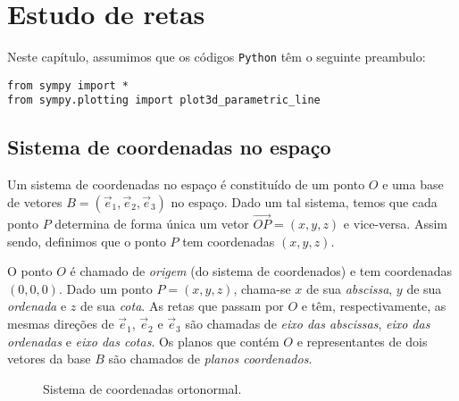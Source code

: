 
\chapter{Estudo de retas}\label{cap_er}
\thispagestyle{fancy}

\ifispython
\begin{obs}\label{obs:cap_er_py}
  Neste capítulo, assumimos que os códigos \verb+Python+ têm o seguinte preambulo:
\begin{verbatim}
from sympy import *
from sympy.plotting import plot3d_parametric_line
\end{verbatim}
\end{obs}
\fi

\section{Sistema de coordenadas no espaço}\label{cap_er_sec_siscoord}

Um sistema de coordenadas no espaço é constituído de um ponto $O$ e uma base de vetores $B = (\vec{e}_1, \vec{e}_2, \vec{e}_3)$ no espaço. Dado um tal sistema, temos que cada ponto $P$ determina de forma única um vetor $\overrightarrow{OP} = (x,y,z)$ e vice-versa. Assim sendo, definimos que o ponto $P$ tem coordenadas $(x,y,z)$.

O ponto $O$ é chamado de \emph{origem} (do sistema de coordenados) e tem coordenadas $(0,0,0)$. Dado um ponto $P=(x,y,z)$, chama-se $x$ de sua \emph{abscissa}, $y$ de sua \emph{ordenada} e $z$ de sua \emph{cota}. As retas que passam por $O$ e têm, respectivamente, as mesmas direções de $\vec{e}_1$, $\vec{e}_2$ e $\vec{e}_3$ são chamadas de \emph{eixo das abscissas}, \emph{eixo das ordenadas} e \emph{eixo das cotas}. Os planos que contém $O$ e representantes de dois vetores da base $B$ são chamados de \emph{planos coordenados}.

\begin{figure}[H]
  \centering
  \caption{Sistema de coordenadas ortonormal.}
  \label{fig:sis_coord_orto}
\end{figure}

